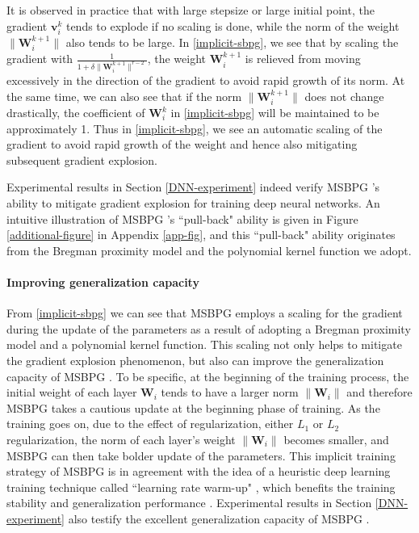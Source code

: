 \documentclass[twoside,11pt]{article}
\def\vv{{\bm{v}}}
\def\mW{{\bm{W}}}
\begin{document}
{It is observed in practice that with large stepsize or large initial point, the gradient $\vv_i^k$ tends to explode if no scaling is done, while
the norm of the weight $\|\mW_i^{k+1}\|$ also tends to be large. In \eqref{implicit-sbpg}, we see that by scaling the gradient with $\frac{1}{1+\delta\|\mW_i^{k+1}\|^{r-2}}$, the weight $\mW_i^{k+1}$ is relieved from moving excessively in the direction of the gradient to avoid 
rapid growth of its norm. At the same time, we can also see that
if the norm  $\|\mW_i^{k+1}\|$ does not change drastically, 
the coefficient of $\mW_i^k$ in \eqref{implicit-sbpg} will 
be maintained to be approximately 1. 
Thus in \eqref{implicit-sbpg}, 
we see an automatic scaling of the gradient to avoid rapid growth
of the weight and hence also mitigating subsequent gradient explosion.}

Experimental results in Section \ref{DNN-experiment} indeed verify MSBPG 's ability to mitigate gradient explosion for training deep neural networks. An intuitive illustration of MSBPG 's ``pull-back" ability is given in Figure \ref{additional-figure} in Appendix \ref{app-fig}, and this ``pull-back" ability originates from the Bregman proximity model and the polynomial kernel function we adopt.

\paragraph{Improving generalization capacity}
From \eqref{implicit-sbpg} we can see that MSBPG  employs a scaling for the gradient during the update of the parameters as a result of adopting a Bregman proximity model and a polynomial kernel function. 
This scaling  not only helps to mitigate the gradient explosion phenomenon, but also can improve the generalization capacity of MSBPG . To be specific, at the beginning of the training process, the initial weight of each layer $\mW_i$ tends to have a larger norm $\|\mW_i\|$ and therefore MSBPG  takes a cautious update at the beginning phase of training. As the training goes on, due to the effect of regularization, either $L_1$ or $L_2$ regularization, the norm of each layer's weight $\|\mW_i\|$ becomes smaller, and MSBPG  can then take bolder update of the parameters. This implicit training strategy of MSBPG  is in agreement with the idea of a heuristic deep learning training technique called ``learning rate warm-up" \citep{gotmare2018closer}, which benefits the training stability and generalization performance \citep{liu2019variance}. Experimental results in Section \ref{DNN-experiment} also testify the excellent generalization capacity of MSBPG .
\end{document}
